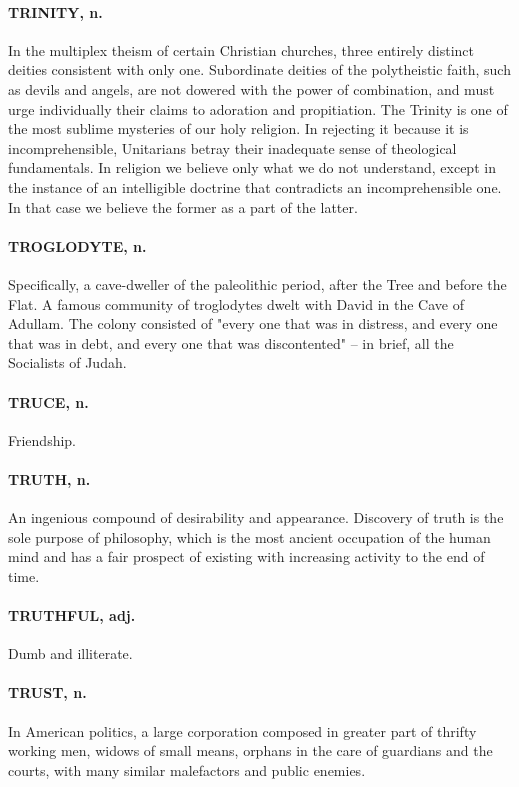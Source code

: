 \documentclass[11pt]{article}
\begin{document}
\paragraph{TRINITY, n.}  In the multiplex theism of certain Christian churches,
three entirely distinct deities consistent with only one.  Subordinate
deities of the polytheistic faith, such as devils and angels, are not
dowered with the power of combination, and must urge individually
their claims to adoration and propitiation.  The Trinity is one of the
most sublime mysteries of our holy religion.  In rejecting it because
it is incomprehensible, Unitarians betray their inadequate sense of
theological fundamentals.  In religion we believe only what we do not
understand, except in the instance of an intelligible doctrine that
contradicts an incomprehensible one.  In that case we believe the
former as a part of the latter.

\paragraph{TROGLODYTE, n.}  Specifically, a cave-dweller of the paleolithic
period, after the Tree and before the Flat.  A famous community of
troglodytes dwelt with David in the Cave of Adullam.  The colony
consisted of "every one that was in distress, and every one that was
in debt, and every one that was discontented" -- in brief, all the
Socialists of Judah.

\paragraph{TRUCE, n.}  Friendship.

\paragraph{TRUTH, n.}  An ingenious compound of desirability and appearance.
Discovery of truth is the sole purpose of philosophy, which is the
most ancient occupation of the human mind and has a fair prospect of
existing with increasing activity to the end of time.

\paragraph{TRUTHFUL, adj.}  Dumb and illiterate.

\paragraph{TRUST, n.}  In American politics, a large corporation composed in
greater part of thrifty working men, widows of small means, orphans in
the care of guardians and the courts, with many similar malefactors
and public enemies.
\end{document}
